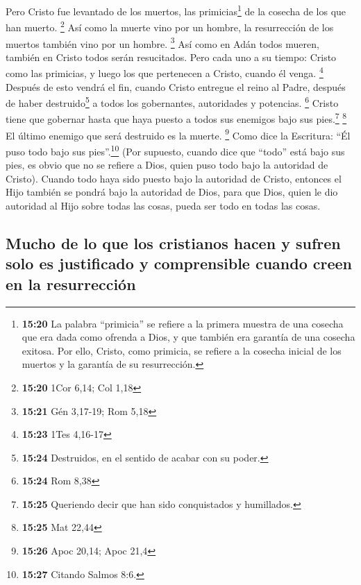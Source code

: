  Pero Cristo fue levantado de los muertos, las
primicias\footnote{\textbf{15:20} La palabra ``primicia'' se refiere a
  la primera muestra de una cosecha que era dada como ofrenda a Dios, y
  que también era garantía de una cosecha exitosa. Por ello, Cristo,
  como primicia, se refiere a la cosecha inicial de los muertos y la
  garantía de su resurrección.} de la cosecha de los que han muerto.
\footnote{\textbf{15:20} 1Cor 6,14; Col 1,18}  Así como
la muerte vino por un hombre, la resurrección de los muertos también
vino por un hombre. \footnote{\textbf{15:21} Gén 3,17-19; Rom 5,18}
 Así como en Adán todos mueren, también en Cristo todos
serán resucitados.  Pero cada uno a su tiempo: Cristo
como las primicias, y luego los que pertenecen a Cristo, cuando él
venga. \footnote{\textbf{15:23} 1Tes 4,16-17}  Después de
esto vendrá el fin, cuando Cristo entregue el reino al Padre, después de
haber destruido\footnote{\textbf{15:24} Destruidos, en el sentido de
  acabar con su poder.} a todos los gobernantes, autoridades y
potencias. \footnote{\textbf{15:24} Rom 8,38}  Cristo
tiene que gobernar hasta que haya puesto a todos sus enemigos bajo sus
pies.\footnote{\textbf{15:25} Queriendo decir que han sido conquistados
  y humillados.} \footnote{\textbf{15:25} Mat 22,44}  El
último enemigo que será destruido es la muerte. \footnote{\textbf{15:26}
  Apoc 20,14; Apoc 21,4}  Como dice la Escritura: ``Él
puso todo bajo sus pies''.\footnote{\textbf{15:27} Citando Salmos 8:6.}
(Por supuesto, cuando dice que ``todo'' está bajo sus pies, es obvio que
no se refiere a Dios, quien puso todo bajo la autoridad de Cristo).
 Cuando todo haya sido puesto bajo la autoridad de
Cristo, entonces el Hijo también se pondrá bajo la autoridad de Dios,
para que Dios, quien le dio autoridad al Hijo sobre todas las cosas,
pueda ser todo en todas las cosas.

\hypertarget{mucho-de-lo-que-los-cristianos-hacen-y-sufren-solo-es-justificado-y-comprensible-cuando-creen-en-la-resurrecciuxf3n}{%
\subsection{Mucho de lo que los cristianos hacen y sufren solo es
justificado y comprensible cuando creen en la
resurrección}\label{mucho-de-lo-que-los-cristianos-hacen-y-sufren-solo-es-justificado-y-comprensible-cuando-creen-en-la-resurrecciuxf3n}}

